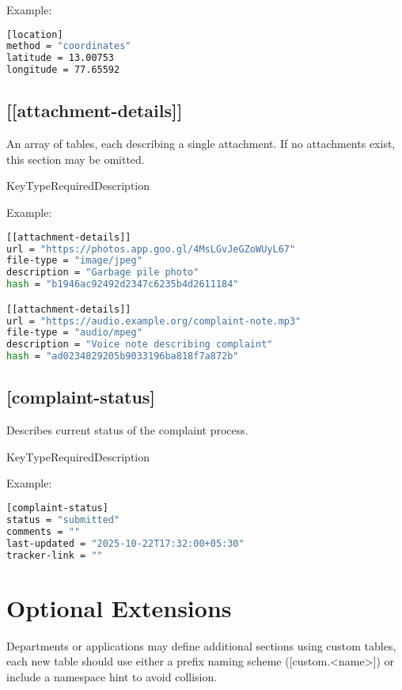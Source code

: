 Example:
\medskip
\begin{lstlisting}[language=bash]
[location]
method = "coordinates"
latitude = 13.00753
longitude = 77.65592
\end{lstlisting}

\subsection{[[attachment-details]]}

An array of tables, each describing a single attachment.
If no attachments exist, this section may be omitted.

\begin{specsubtable}{Key}{Type}{Required}{Description}
\end{specsubtable}

Example:
\medskip
\begin{lstlisting}[language=bash]
[[attachment-details]]
url = "https://photos.app.goo.gl/4MsLGvJeGZoWUyL67"
file-type = "image/jpeg"
description = "Garbage pile photo"
hash = "b1946ac92492d2347c6235b4d2611184"

[[attachment-details]]
url = "https://audio.example.org/complaint-note.mp3"
file-type = "audio/mpeg"
description = "Voice note describing complaint"
hash = "ad0234829205b9033196ba818f7a872b"
\end{lstlisting}

\subsection{[complaint-status]}

Describes current status of the complaint process.

\begin{specsubtable}{Key}{Type}{Required}{Description}
\end{specsubtable}

Example:
\medskip
\begin{lstlisting}[language=bash]
[complaint-status]
status = "submitted"
comments = ""
last-updated = "2025-10-22T17:32:00+05:30"
tracker-link = ""
\end{lstlisting}

\section{Optional Extensions}

Departments or applications may define additional sections using custom tables,
each new table should use either a prefix naming scheme ([custom.<name>]) or
include a namespace hint to avoid collision.
